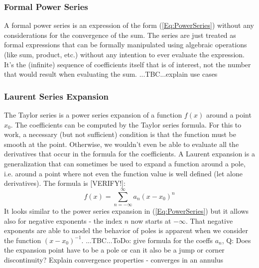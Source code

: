 
\subsubsection{Formal Power Series}
A formal power series is an expression of the form (\ref{Eq:PowerSeries}) without any considerations for the convergence of the sum. The series are just treated as formal expressions that can be formally manipulated using algebraic operations (like sum, product, etc.) without any intention to ever evaluate the expression. It's the (infinite) sequence of coefficients itself that is of interest, not the number that would result when evaluating the sum. ...TBC...explain use cases


\subsubsection{Laurent Series Expansion}
The Taylor series is a power series expansion of a function $f(x)$ around a point $x_0$. The coefficients can be computed by the Taylor series formula. For this to work, a necessary (but not sufficient) condition is that the function must be smooth at the point. Otherwise, we wouldn't even be able to evaluate all the derivatives that occur in the formula for the coefficients. A Laurent expansion is a generalization that can sometimes be used to expand a function around a pole, i.e. around a point where not even the function value is well defined (let alone derivatives). The formula is [VERIFY!]:
\begin{equation}
\label{Eq:LaurentSeries}
f(x) = \sum_{n=-\infty}^\infty a_n  (x-x_0)^n
\end{equation}
It looks similar to the power series expansion in (\ref{Eq:PowerSeries}) but it allows also for negative exponents - the index $n$ now starts at $-\infty$. That negative exponents are able to model the behavior of poles is apparent when we consider the function $(x-x_0)^{-1}$. ...TBC...ToDo: give formula for the coeffs $a_n$, Q: Does the expansion point have to be a pole or can it also be a jump or corner discontinuity? Explain convergence properties - converges in an annulus

